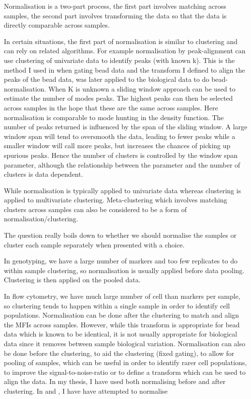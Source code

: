 Normalisation is a two-part process, the first part involves matching across samples,
the second part involves transforming the data so that the data is directly comparable across samples.

In certain situations,
the first part of normalisation is similar to clustering and can rely on related algorithms.
For example normalisation by peak-alignment can use clustering of univariate data to identify peaks (with known k).
This is the method I used in  when gating bead data and the transform I defined to align the peaks of the bead data,
was later applied to the biological data to do bead-normalisation.
When K is unknown a sliding window approach can be used to estimate the number of modes peaks.
The highest peaks can then be selected across samples in the hope that these are the same across samples.
Here normalisation is comparable to mode hunting in the density function.
The number of peaks returned is influenced by the span of the sliding window.
A large window span will tend to oversmooth the data, leading to fewer peaks while
a smaller window will call more peaks, but increases the chances of picking up spurious peaks.
Hence the number of clusters is controlled by the window span parameter, although the relationship between the parameter and the number of clusters is data dependent.

While normalisation is typically applied to univariate data whereas clustering is applied to multivariate clustering.
Meta-clustering which involves matching clusters across samples can also be considered to be a form of normalisation/clustering.

The question really boils down to whether we should normalise the samples or cluster each sample separately when presented with a choice.

In genotyping, we have a large number of markers and too few replicates to do within sample clustering, so normalisation is usually applied before data pooling.
Clustering is then applied on the pooled data.

In flow cytometry, we have much large number of cell than markers per sample,
so clustering tends to happen within a single sample in order to identify cell populations.
Normalisation can be done after the clustering to match and align the MFIs across samples.
However, while this transform is appropriate for bead data which is known to be identical,
it is not usually appropriate for biological data since it removes between sample biological variation.
Normalisation can also be done before the clustering, to aid the clustering (fixed gating),
to allow for pooling of samples, which can be useful in order to identify rarer cell populations,
to improve the signal-to-noise-ratio or to define a transform which can be used to align the data.
In my thesis, I have used both normalising before and after clustering.
In  and , I have have attempted to normalise

